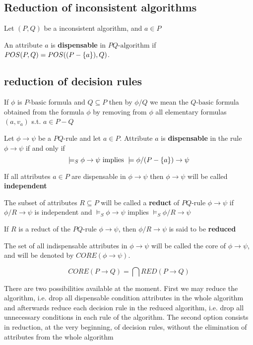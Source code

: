 \documentclass[11pt]{article}
\begin{document}
\subsection{Reduction of inconsistent algorithms}
\label{sec:org6dbcc2c}
Let \((P,Q)\) be a inconsistent algorithm, and \(a\in P\)

An attribute \(a\) is \textbf{dispensable} in \(PQ\text{-algorithm}\) if
\(POS(P,Q)=POS((P-\left\{ a\right\}),Q)\).
\subsection{reduction of decision rules}
\label{sec:org8949837}
If \(\phi\) is \(P\text{-basic}\) formula and \(Q\subseteq P\) then by \(\phi/Q\) we
mean the \(Q\text{-basic}\) formula obtained from the formula \(\phi\) by removing
from \(\phi\) all elementary formulas \((a,v_a)\) s.t. \(a\in P-Q\)

Let \(\phi\to\psi\) be a \(PQ\text{-rule}\) and let \(a\in P\). Attribute \(a\) is
\textbf{dispensable} in the rule \(\phi\to\psi\) if and only if
\begin{equation*}
\models_S\phi\to\psi \text{ implies } \models \phi/(P-\left\{ a \right\})\to \psi
\end{equation*}

If all attributes \(a\in P\) are dispensable in \(\phi\to\psi\) then \(\phi\to\psi\)
will be called \textbf{independent}

The subset of attributes \(R\subseteq P\) will be called a \textbf{reduct} of
\(PQ\text{-rule}\) \(\phi\to\psi\) if \(\phi/R\to\psi\) is independent and
\(\models_S\phi\to\psi\) implies \(\models_S\phi/R\to\psi\)

If \(R\) is a reduct of the \(PQ\text{-rule}\) \(\phi\to\psi\), then \(\phi/R\to\psi\)
is said to be \textbf{reduced}

The set of all indispensable attributes in \(\phi\to\psi\) will be called the
core of \(\phi\to\psi\), and will be denoted by \(CORE(\phi\to\psi)\).

\begin{proposition}[7.8]
\begin{equation*}
CORE(P\to Q)=\bigcap RED(P\to Q)
\end{equation*}
\end{proposition}

There are two possibilities available at the moment. First we may reduce the
algorithm, i.e. drop all dispensable condition attributes in the whole algorithm 
and afterwards reduce each decision rule in the reduced algorithm, i.e. drop all
unnecessary conditions in each rule of the algorithm. The second option consists
in reduction, at the very beginning, of decision rules, without the
elimination of attributes from the whole algorithm
\end{document}
